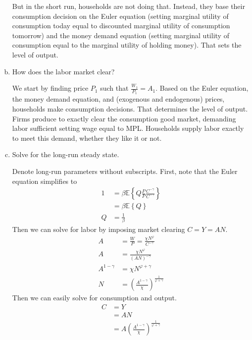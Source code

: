 \documentclass[answers]{exam}
\newcommand{\1}{\mathbf{1}}
\begin{document}
\begin{enumerate}[(a)]
\begin{solution}
        But in the short run, households are not doing that. Instead, they base their consumption decision on the Euler equation (setting marginal utility of consumption today equal to discounted marginal utility of consumption tomorrow) and the money demand equation (setting marginal utility of consumption equal to the marginal utility of holding money). That sets the level of output.
    \end{solution}
	\item How does the labor market clear?
	\begin{solution}
        We start by finding price $P_1$ such that $\frac{W_1}{P_1} = A_1$. Based on the Euler equation, the money demand equation, and (exogenous and endogenous) prices, households make consumption decisions. That determines the level of output. Firms produce to exactly clear the consumption good market, demanding labor sufficient setting wage equal to MPL. Households supply labor exactly to meet this demand, whether they like it or not.
    \end{solution}
	\item Solve for the long-run steady state.
	\begin{solution}
        Denote long-run parameters without subscripts. First, note that the Euler equation simplifies to
        \begin{align*}
            1&=\beta \mathbb{E}\left\{Q \frac{P}{P} \frac{C^{-\gamma}}{C^{-\gamma}}\right\} \\
            &=\beta \mathbb{E}\left\{Q\right\} \\
            Q & = \frac{1}{\beta}
        \end{align*}
        Then we can solve for labor by imposing market clearing $C = Y = AN$.
        \begin{align*}
            A & = \frac{W}{P} =\frac{\chi N^\varphi}{C^{-\gamma}} \\
            A & =\frac{\chi N^\varphi}{(AN)^{-\gamma}} \\
            A^{1 - \gamma} & = \chi N^{\varphi+\gamma} \\
            N & =\left(\frac{A^{1 - \gamma}}{\chi}\right)^{\frac{1}{\varphi + \gamma}}
        \end{align*}
        Then we can easily solve for consumption and output.
        \begin{align*}
            C & = Y \\
            & = AN \\
            & = A\left(\frac{A^{1 - \gamma}}{\chi}\right)^{\frac{1}{\varphi + \gamma}} \\

\end{align*}
\end{solution}
\end{enumerate}
\end{document}

